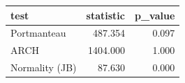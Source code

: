 \begin{tabular}{lrr}
\toprule
test & statistic & p\_value\\
\midrule
Portmanteau & 487.354 & 0.097\\
ARCH & 1404.000 & 1.000\\
Normality (JB) & 87.630 & 0.000\\
\bottomrule
\end{tabular}
